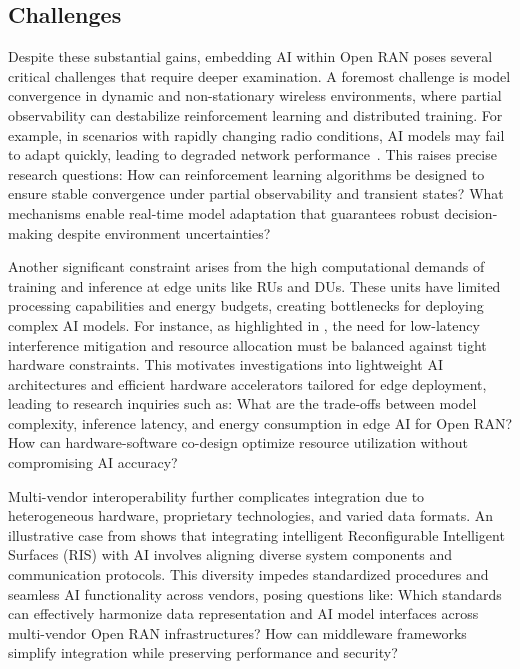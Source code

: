 \documentclass[sigconf]{acmart}
\begin{document}
\subsection{Challenges}

Despite these substantial gains, embedding AI within Open RAN poses several critical challenges that require deeper examination. A foremost challenge is model convergence in dynamic and non-stationary wireless environments, where partial observability can destabilize reinforcement learning and distributed training. For example, in scenarios with rapidly changing radio conditions, AI models may fail to adapt quickly, leading to degraded network performance~\cite{ref54}. This raises precise research questions: How can reinforcement learning algorithms be designed to ensure stable convergence under partial observability and transient states? What mechanisms enable real-time model adaptation that guarantees robust decision-making despite environment uncertainties?

Another significant constraint arises from the high computational demands of training and inference at edge units like RUs and DUs. These units have limited processing capabilities and energy budgets, creating bottlenecks for deploying complex AI models. For instance, as highlighted in \cite{ref48}, the need for low-latency interference mitigation and resource allocation must be balanced against tight hardware constraints. This motivates investigations into lightweight AI architectures and efficient hardware accelerators tailored for edge deployment, leading to research inquiries such as: What are the trade-offs between model complexity, inference latency, and energy consumption in edge AI for Open RAN? How can hardware-software co-design optimize resource utilization without compromising AI accuracy?

Multi-vendor interoperability further complicates integration due to heterogeneous hardware, proprietary technologies, and varied data formats. An illustrative case from \cite{ref49} shows that integrating intelligent Reconfigurable Intelligent Surfaces (RIS) with AI involves aligning diverse system components and communication protocols. This diversity impedes standardized procedures and seamless AI functionality across vendors, posing questions like: Which standards can effectively harmonize data representation and AI model interfaces across multi-vendor Open RAN infrastructures? How can middleware frameworks simplify integration while preserving performance and security?
\end{document}
